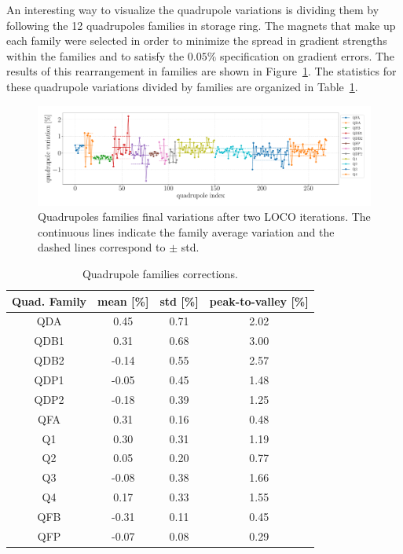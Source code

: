 An interesting way to visualize the quadrupole variations is dividing them by following the 12 quadrupoles families in storage ring. The magnets that make up each family were selected in order to minimize the spread in gradient strengths within the families and to satisfy the $0.05\%$ specification on gradient errors. The results of this rearrangement in families are shown in Figure~\ref{fig:loco_corrections_final_families}. The statistics for these quadrupole variations divided by families are organized in Table~\ref{tab:quad_fam_corr}.
\begin{figure}[h!]
\centering
\includegraphics[width=1.0\textwidth]{figures/final_quads_correction_families_fix.pdf}
\caption{Quadrupoles families final variations after two LOCO iterations. The continuous lines indicate the family average variation and the dashed lines correspond to $\pm$ std.}
\label{fig:loco_corrections_final_families}
\end{figure}
\begin{table}[h!]
    \centering
    \caption{Quadrupole families corrections.}
    \label{tab:quad_fam_corr}
    \begin{tabular}{cccc}
        \toprule\toprule
        Quad. Family & mean [\%] & std [\%] & peak-to-valley [\%] \\
        \hline
        QDA  &  0.45  & 0.71 & 2.02 \\
        QDB1 &  0.31  & 0.68 & 3.00 \\
        QDB2 &  -0.14 &  0.55&  2.57 \\
        QDP1 &  -0.05 &  0.45 &  1.48 \\
        QDP2 &  -0.18 &  0.39 &  1.25 \\
        \hline
        QFA  &  0.31  & 0.16 & 0.48 \\
        Q1   &  0.30  & 0.31 & 1.19 \\
        Q2   &  0.05  & 0.20 & 0.77 \\
        Q3   &  -0.08 &  0.38 &  1.66 \\
        Q4   &  0.17  & 0.33 & 1.55 \\
        \hline
        QFB  &  -0.31 & 0.11 &  0.45 \\
        QFP  &  -0.07 &  0.08 &   0.29 \\
        \bottomrule\bottomrule
    \end{tabular}
\end{table}

